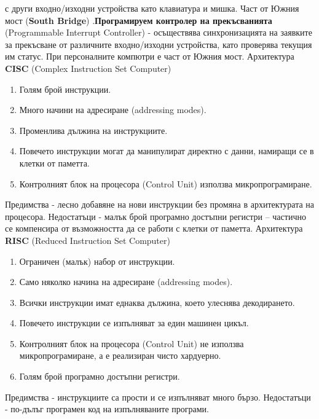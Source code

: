 \documentclass{article}
\begin{document}
с други входно/изходни устройства като клавиатура и мишка. Част от Южния мост (\textbf{South Bridge}) \newline{}.\textbf{Програмируем контролер на прекъсванията} (Programmable Interrupt Controller) - осъществява синхронизацията на
заявките за прекъсване от различните входно/изходни устройства, като проверява текущия им статус. При персоналните
компютри е част от Южния мост. \newline\newline
Архитектура \textbf{CISC} (Complex Instruction Set Computer)
\begin{enumerate}
    \item Голям брой инструкции.
    \item Много начини на адресиране (addressing modes).
    \item Променлива дължина на инструкциите.
    \item Повечето инструкции могат да манипулират директно с данни, намиращи се в клетки от паметта.
    \item Контролният блок на процесора (Control Unit) използва микропрограмиране.
\end{enumerate}
Предимства - лесно добавяне на нови инструкции без промяна в архитектурата на процесора. \newline
Недостатъци - малък брой програмно достъпни регистри – частично се компенсира от възможността да се работи с клетки от паметта. \newline\newline
Архитектура \textbf{RISC} (Reduced Instruction Set Computer)
\begin{enumerate}
    \item Ограничен (малък) набор от инструкции.
    \item Само няколко начина на адресиране (addressing modes).
    \item Всички инструкции имат еднаква дължина, което улеснява декодирането.
    \item Повечето инструкции се изпълняват за един машинен цикъл.
    \item Контролният блок на процесора (Control Unit) не използва микропрограмиране, а е реализиран чисто хардуерно.
    \item Голям брой програмно достъпни регистри.
\end{enumerate}
Предимства - инструкциите са прости и се изпълняват много бързо. \newline
Недостатъци - по-дълъг програмен код на изпълняваните програми. \newline\newline
\end{document}
